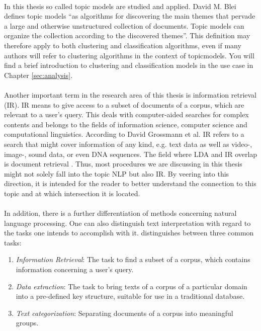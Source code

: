 \documentclass[11pt,a4paper]{article}
\begin{document}
\ \\
In this thesis so called topic models are studied and applied. David M. Blei defines topic models “as algorithms for discovering the main themes that pervade a large and otherwise unstructured collection of documents. Topic models can organize the collection according to the discovered themes”\cite{Blei2012}. This definition may therefore apply to both clustering and classification algorithms, even if many authors will refer to clustering algorithms in the context of topicmodels. You will find a brief introduction to clustering and classification models in the use case in Chapter \ref{sec:analysis}.\\
\ \\
Another important term in the research area of this thesis is information retrieval (IR). IR means to give access to a subset of documents of a corpus, which are relevant to a user’s query. This deals with computer-aided searches for complex contents and belongs to the fields of information science, computer science and computational linguistics. According to David Grossmann et al. IR refers to a search that might cover information of any kind, e.g. text data as well as video-, image-, sound data, or even DNA sequences. The field where LDA and IR overlap is document retrieval \cite{Grossmann2004}. Thus, most procedures we are discussing in this thesis might not solely fall into the topic NLP but also IR. By veering into this direction, it is intended for the reader to better understand the connection to this topic and at which intersection it is located. \\
\ \\
In addition, there is a further differentiation of methods concerning natural language processing. One can also distinguish text interpretation with regard to the tasks one intends to accomplish with it. \cite{Jacobs1993} distinguishes between three common tasks:
\begin{enumerate}
	\item \textit{Information Retrieval}: The task to find a subset of a corpus, which contains information concerning a user’s query.

	\item \textit{Data extraction}: The task to bring texts of a corpus of a particular domain into a pre-defined key structure, suitable for use in a traditional database.

	\item \textit{Text categorization}: Separating documents of a corpus into meaningful groups.
\end{enumerate}
\end{document}
